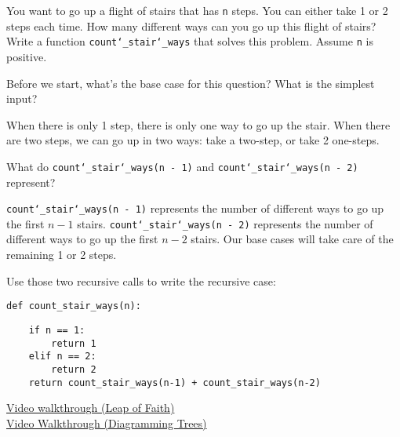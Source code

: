 \question You want to go up a flight of stairs that has \texttt{n} steps. You can
either take 1 or 2 steps each time. How many different ways can you go up this
flight of stairs? Write a function {\tt count\char`_stair\char`_ways} that
solves this problem. Assume \texttt{n} is positive.

Before we start, what's the base case for this question? What is the simplest
input?
\begin{solution}[0.75in]
When there is only 1 step, there is only one way to go up the stair. When
there are two steps, we can go up in two ways: take a two-step, or take 2
one-steps.
\end{solution}
What do \texttt{count\char`_stair\char`_ways(n - 1)} and
\texttt{count\char`_stair\char`_ways(n - 2)} represent?
\begin{solution}[0.75in]
\texttt{count\char`_stair\char`_ways(n - 1)} represents the number of
different ways to go up the first $n-1$ stairs.
\texttt{count\char`_stair\char`_ways(n - 2)} represents the number of
different ways to go up the first $n-2$ stairs. Our base cases will take
care of the remaining 1 or 2 steps.
\end{solution}

\begin{blocksection}
Use those two recursive calls to write the recursive case:
\vspace{.5in}
\begin{lstlisting}
def count_stair_ways(n):
\end{lstlisting}
\begin{solution}[1.5in]
\begin{lstlisting}
    if n == 1:
        return 1
    elif n == 2:
        return 2
    return count_stair_ways(n-1) + count_stair_ways(n-2)
\end{lstlisting}
\href{https://youtu.be/VcZPTlE56G8?t=1h7m6s}{Video walkthrough (Leap of Faith)} \\
\href{https://www.youtube.com/watch?v=sgNGso3LhD8&index=6&list=PLx38hZJ5RLZd35oDi3TGz5p9DyyxU3WwA}{Video Walkthrough (Diagramming Trees)}
\end{solution}
\end{blocksection}
